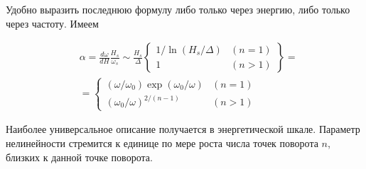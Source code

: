 \documentclass[10pt]{article}
\begin{document}
Удобно выразить последнюю формулу либо только через энергию, либо только через частоту. Имеем


\begin{align*}
& \alpha=\frac{d \omega}{d H} \frac{H_{s}}{\omega_{s}} \sim \frac{H_{s}}{\Delta}\left\{\begin{array}{ll}
1 / \ln \left(H_{s} / \Delta\right) & (n=1) \\
1 & (n>1)
\end{array}\right\}= \\
&= \begin{cases}\left(\omega / \omega_{0}\right) \exp \left(\omega_{0} / \omega\right) & (n=1) \\
\left(\omega_{0} / \omega\right)^{2 /(n-1)} & (n>1)\end{cases} \tag{3.27}
\end{align*}


Наиболее универсальное описание получается в энергетической шкале. Параметр нелинейности стремится к единице по мере роста числа точек поворота $n$, близких к данной точке поворота.
\end{document}
